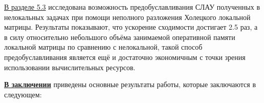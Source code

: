 \underline{В разделе 5.3} исследована возможность предобуславливания СЛАУ полученных в нелокальных задачах при помощи неполного разложения Холецкого локальной матрицы. Результаты показывают, что ускорение сходимости достигает 2.5 раз, а в силу относительно небольшого объёма занимаемой оперативной памяти локальной матрицы по сравнению с нелокальной, такой способ предобуславливания является ещё и достаточно экономичным с точки зрения использовании вычислительных ресурсов.


\FloatBarrier
{}                                  %
\underline{\textbf{В заключении}} приведены основные результаты работы, которые заключаются в следующем:



